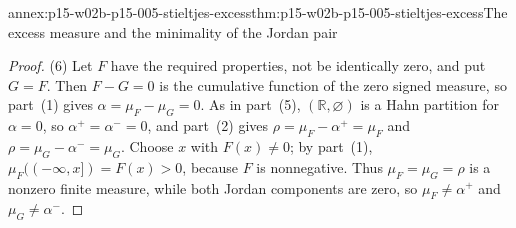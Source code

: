 \begin{annexitem}{annex:p15-w02b-p15-005-stieltjes-excess}{thm:p15-w02b-p15-005-stieltjes-excess}{The excess measure and the minimality of the Jordan pair}
\begin{proof}
(6) Let \(F\) have the required properties, not be identically zero,
and put \(G=F\). Then \(F-G=0\) is the cumulative function of the zero
signed measure, so part~(1) gives \(\alpha=\mu_F-\mu_G=0\). As in
part~(5), \((\mathbb R,\varnothing)\) is a Hahn partition for \(\alpha=0\),
so \(\alpha^+=\alpha^-=0\), and part~(2) gives
\(\rho=\mu_F-\alpha^+=\mu_F\) and \(\rho=\mu_G-\alpha^-=\mu_G\).
Choose \(x\) with \(F(x)\neq0\); by part~(1),
\(\mu_F((-\infty,x])=F(x)>0\), because \(F\) is nonnegative. Thus
\(\mu_F=\mu_G=\rho\) is a nonzero finite measure, while both Jordan
components are zero, so \(\mu_F\neq\alpha^+\) and \(\mu_G\neq\alpha^-\).
\end{proof}
\end{annexitem}
